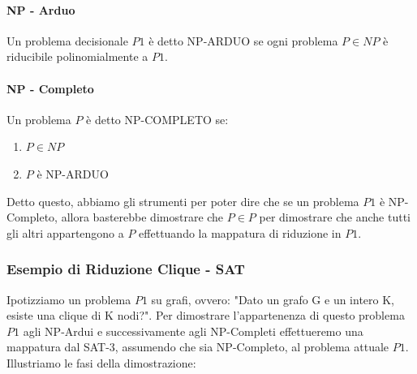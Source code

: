 \documentclass{article}
\begin{document}
\paragraph{NP - Arduo}

Un problema decisionale $P1$ è detto NP-ARDUO se ogni problema $P \in NP$ è riducibile polinomialmente a $P1$.

\paragraph{NP - Completo}

Un problema $P$ è detto NP-COMPLETO se:

\begin{enumerate}
    \item $P \in NP$
    \item $P$ è NP-ARDUO
\end{enumerate}

Detto questo, abbiamo gli strumenti per poter dire che se un problema $P1$ è NP-Completo, allora basterebbe dimostrare che $P \in P$ per dimostrare che anche tutti gli altri appartengono a $P$ effettuando la mappatura di riduzione in $P1$.

\vskip 1.5cm


\subsubsection{Esempio di Riduzione Clique - SAT}

Ipotizziamo un problema $P1$ su grafi, ovvero: "Dato un grafo G e un intero K, esiste una clique di K nodi?". Per dimostrare l'appartenenza di questo problema $P1$ agli NP-Ardui e successivamente agli NP-Completi effettueremo una mappatura dal SAT-3, assumendo che sia NP-Completo, al problema attuale $P1$.
Illustriamo le fasi della dimostrazione:

\newpage
\end{document}
